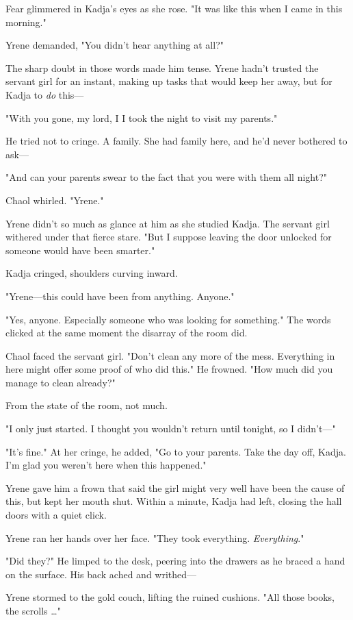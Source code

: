 Fear glimmered in Kadja's eyes as she rose. "It was like this when I came in this morning."

Yrene demanded, "You didn't hear anything at all?"

The sharp doubt in those words made him tense. Yrene hadn't trusted the servant girl for an instant, making up tasks that would keep her away, but for Kadja to \emph{do} this---

"With you gone, my lord, I  I took the night to visit my parents."

He tried not to cringe. A family. She had family here, and he'd never bothered to ask---

"And can your parents swear to the fact that you were with them all night?"

Chaol whirled. "Yrene."

Yrene didn't so much as glance at him as she studied Kadja. The servant girl withered under that fierce stare. "But I suppose leaving the door unlocked for someone would have been smarter."

Kadja cringed, shoulders curving inward.

"Yrene---this could have been from anything. Anyone."

"Yes, anyone. Especially someone who was looking for something." The words clicked at the same moment the disarray of the room did.

Chaol faced the servant girl. "Don't clean any more of the mess. Everything in here might offer some proof of who did this." He frowned. "How much did you manage to clean already?"

From the state of the room, not much.

"I only just started. I thought you wouldn't return until tonight, so I didn't---"

"It's fine." At her cringe, he added, "Go to your parents. Take the day off, Kadja. I'm glad you weren't here when this happened."

Yrene gave him a frown that said the girl might very well have been the cause of this, but kept her mouth shut. Within a minute, Kadja had left, closing the hall doors with a quiet click.

Yrene ran her hands over her face. "They took everything.
\emph{Everything}."

"Did they?" He limped to the desk, peering into the drawers as he braced a hand on the surface. His back ached and writhed---

Yrene stormed to the gold couch, lifting the ruined cushions. "All those books, the scrolls \ldots"

